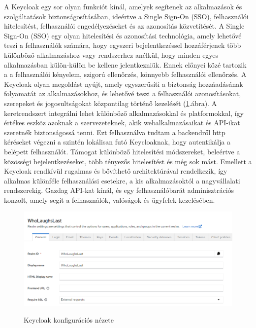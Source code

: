 \documentclass[a4paper,twoside]{article}
\begin{document}
A Keycloak egy sor olyan funkciót kínál, amelyek segítenek az alkalmazások és szolgáltatások biztonságosításában, ideértve a Single Sign-On (SSO), felhasználói hitelesítést, felhasználói engedélyezéseket és az azonosítás közvetítését. A Single Sign-On (SSO) egy olyan hitelesítési és azonosítási technológia, amely lehetővé teszi a felhasználók számára, hogy egyszeri bejelentkezéssel hozzáférjenek több különböző alkalmazáshoz vagy rendszerhez anélkül, hogy minden egyes alkalmazásban külön-külön be kellene jelentkezniük. Ennek előnyei közé tartozik a a felhasználói kényelem, szigorú ellenőrzés, könnyebb felhasználói ellenőrzés. A Keycloak olyan megoldást nyújt, amely egyszerűsíti a biztonság hozzáadásának folyamatát az alkalmazásokhoz, és lehetővé teszi a felhasználói azonosításokat, szerepeket és jogosultságokat központilag történő kezelését (\ref{keycloak-login}.ábra). A keretrendszert integrálni lehet különböző alkalmazásokkal és platformokkal, így értékes eszköz azoknak a szervezeteknek, akik webalkalmazásaikat és API-ikat szeretnék biztonságossá tenni. Ezt felhasználva tudtam a backendről http kéréseket végezni a szintén lokálisan futó Keycloaknak, hogy autentikálja a belépett felhasználót. Támogat különböző hitelesítési módszereket, beleértve a közösségi bejelentkezéseket, több tényezős hitelesítést és még sok mást. Emellett a Keycloak rendkívül rugalmas és bővíthető architektúrával rendelkezik, így alkalmas különféle felhasználási esetekre, a kis alkalmazásoktól a nagyvállalati rendszerekig. Gazdag API-kat kínál, és egy felhasználóbarát adminisztrációs konzolt, amely segít a felhasználók, valóságok és ügyfelek kezelésében.

\begin{figure}
	\caption{Keycloak konfigurációs nézete}
	\raggedleft 
	\includegraphics[scale=0.5]{keycloak-login}
	\label{keycloak-login}
\end{figure}
\end{document}
